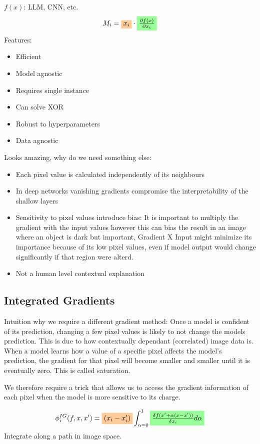 \(f(x)\): LLM, CNN, etc.
\[
M_i = \colorbox{orange!40}{$x_i$} \cdot \colorbox{green!40}{$\frac{\partial f(x)}{\partial x_i}$}
\]
Features:
\begin{itemize}
    \item Efficient
    \item Model agnostic
    \item Requires single instance
    \item Can solve XOR
    \item Robust to hyperparameters
    \item Data agnostic
\end{itemize}
Looks amazing, why do we need something else:
\begin{itemize}
    \item Each pixel value is calculated independently of its neighbours
    \item In deep networks vanishing gradients compromise the interpretability of the shallow layers
    \item Sensitivity to pixel values introduce bias:
    It is important to multiply the gradient with the input values however this can bias the result in an image where an object is dark but important, Gradient X Input might minimize its importance because of its low pixel values, even if model output would change significantly if that region were alterd.
    \item Not a human level contextual explanation
\end{itemize}
\subsection{Integrated Gradients}
Intuition why we require a different gradient method:
Once a model is confident of its prediction, changing a few pixel values is likely to not change the models prediction.
This is due to how contextually dependant (correlated) image data is.
When a model learns how a value of a specific pixel affects the model's prediction, the gradient for that pixel will become smaller and smaller until it is eventually zero. This is called saturation.

We therefore require a trick that allows us to access the gradient information of each pixel when the model is more sensitive to its charge.

\[
\phi_i^{IG}(f,x,x') = \colorbox{orange!40}{$(x_i - x_i')$}\int_{\alpha = 0}^{1} \colorbox{green!40}{$\frac{\delta f(x' + \alpha(x - x'))}{\delta x_i}d\alpha$}
\]
Integrate along a path in image space.

